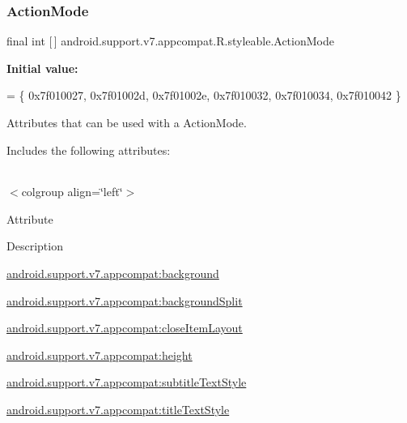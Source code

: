 \subsubsection{\texorpdfstring{Action\+Mode}{ActionMode}}
{\footnotesize\ttfamily final int \mbox{[}$\,$\mbox{]} android.\+support.\+v7.\+appcompat.\+R.\+styleable.\+Action\+Mode\hspace{0.3cm}{\ttfamily [static]}}

{\bfseries Initial value\+:}
\begin{DoxyCode}
= \{
            0x7f010027, 0x7f01002d, 0x7f01002e, 0x7f010032,
            0x7f010034, 0x7f010042
        \}
\end{DoxyCode}
Attributes that can be used with a Action\+Mode. 

Includes the following attributes\+:

\tabulinesep=1mm
\begin{longtabu} spread 0pt [c]{*{0}{|X[-1]}|}
\hline
\end{longtabu}
$<$colgroup align=\char`\"{}left\char`\"{}$>$ 

Attribute

Description 

{\ttfamily \hyperlink{classandroid_1_1support_1_1v7_1_1appcompat_1_1R_1_1styleable_ac2523107dffe1435c22f26b7bc890953}{android.\+support.\+v7.\+appcompat\+:background}}

{\ttfamily \hyperlink{classandroid_1_1support_1_1v7_1_1appcompat_1_1R_1_1styleable_a846fc9b3ed73107bff2246293ce7763e}{android.\+support.\+v7.\+appcompat\+:background\+Split}}

{\ttfamily \hyperlink{classandroid_1_1support_1_1v7_1_1appcompat_1_1R_1_1styleable_a0488491d4fd5b6f8773b484815cbebce}{android.\+support.\+v7.\+appcompat\+:close\+Item\+Layout}}

{\ttfamily \hyperlink{classandroid_1_1support_1_1v7_1_1appcompat_1_1R_1_1styleable_af4cb45abc591ba3b7f173f869cb69cd7}{android.\+support.\+v7.\+appcompat\+:height}}

{\ttfamily \hyperlink{classandroid_1_1support_1_1v7_1_1appcompat_1_1R_1_1styleable_a79b250cbfc7600ab0f0291cc59dc7bbd}{android.\+support.\+v7.\+appcompat\+:subtitle\+Text\+Style}}

{\ttfamily \hyperlink{classandroid_1_1support_1_1v7_1_1appcompat_1_1R_1_1styleable_a7c9fa645d0ba6eaae582d3bb1706309a}{android.\+support.\+v7.\+appcompat\+:title\+Text\+Style}}

